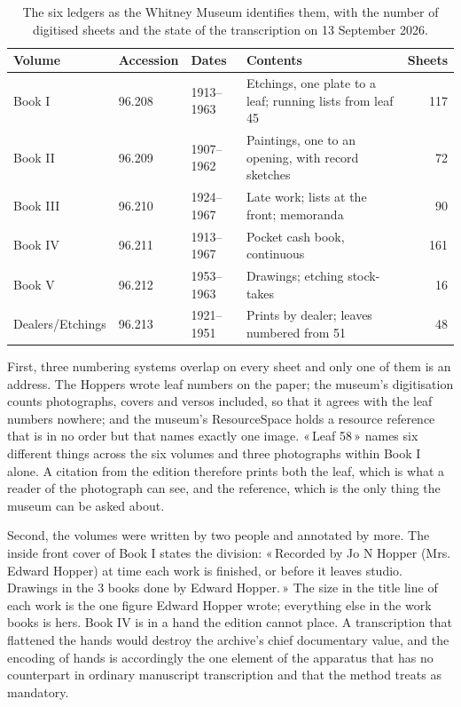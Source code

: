 \documentclass[11pt]{article}
\newcommand{\q}[1]{«\,#1\,»}
\begin{document}
\begin{table}[htbp]\centering\small
\caption{The six ledgers as the Whitney Museum identifies them, with the number of digitised sheets and the state of the transcription on 13 September 2026.}\label{tab:corpus}
\begin{tabular}{llllr}\toprule
Volume & Accession & Dates & Contents & Sheets\\\midrule
Book I & 96.208 & 1913--1963 & Etchings, one plate to a leaf; running lists from leaf 45 & 117\\
Book II & 96.209 & 1907--1962 & Paintings, one to an opening, with record sketches & 72\\
Book III & 96.210 & 1924--1967 & Late work; lists at the front; memoranda & 90\\
Book IV & 96.211 & 1913--1967 & Pocket cash book, continuous & 161\\
Book V & 96.212 & 1953--1963 & Drawings; etching stock-takes & 16\\
Dealers/Etchings & 96.213 & 1921--1951 & Prints by dealer; leaves numbered from 51 & 48\\\bottomrule
\end{tabular}
\end{table}

First, three numbering systems overlap on every sheet and only one of them is an address. The Hoppers wrote leaf numbers on the paper; the museum's digitisation counts photographs, covers and versos included, so that it agrees with the leaf numbers nowhere; and the museum's ResourceSpace holds a resource reference that is in no order but that names exactly one image. \q{Leaf 58} names six different things across the six volumes and three photographs within Book I alone. A citation from the edition therefore prints both the leaf, which is what a reader of the photograph can see, and the reference, which is the only thing the museum can be asked about.

Second, the volumes were written by two people and annotated by more. The inside front cover of Book I states the division: \q{Recorded by Jo N Hopper (Mrs. Edward Hopper) at time each work is finished, or before it leaves studio. Drawings in the 3 books done by Edward Hopper.} The size in the title line of each work is the one figure Edward Hopper wrote; everything else in the work books is hers. Book IV is in a hand the edition cannot place. A transcription that flattened the hands would destroy the archive's chief documentary value, and the encoding of hands is accordingly the one element of the apparatus that has no counterpart in ordinary manuscript transcription and that the method treats as mandatory.
\end{document}
